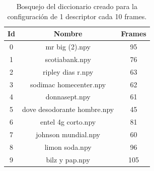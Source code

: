 \documentclass[14pt,letterpaper,hidelinks]{extarticle}
\begin{document}
\begin{table}[]
\centering
\begin{tabular}{@{}ccc@{}}
\toprule
Id & Nombre                      & Frames \\ \midrule
0  & mr big (2).npy              & 95     \\
1  & scotiabank.npy              & 76     \\
2  & ripley dias r.npy           & 63     \\
3  & sodimac homecenter.npy      & 62     \\
4  & donnasept.npy               & 61     \\
5  & dove desodorante hombre.npy & 45     \\
6  & entel 4g corto.npy          & 81     \\
7  & johnson mundial.npy         & 60     \\
8  & limon soda.npy              & 96     \\
9  & bilz y pap.npy              & 105    \\ \bottomrule
\end{tabular}
\captionsetup{justification=centering,margin=2cm}
\caption{Bosquejo del diccionario creado para la configuración de 1 descriptor cada 10 frames. \label{tab:dict}}
\end{table}
\end{document}
